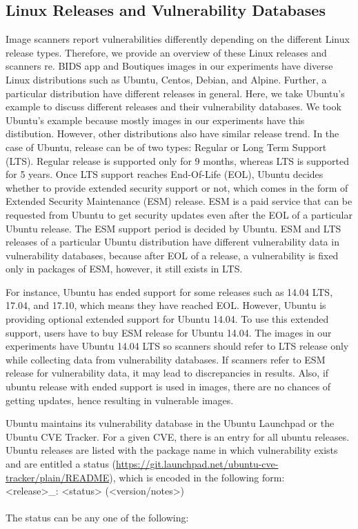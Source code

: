 \documentclass[a4paper,num-refs]{oup-contemporary}
\begin{document}
\subsection{Linux Releases and Vulnerability Databases}

Image scanners report vulnerabilities differently depending on the different Linux release types.
Therefore, we provide an overview of these Linux releases and scanners re. 
BIDS app and Boutiques images in our experiments have diverse Linux
distributions such as Ubuntu, Centos, Debian, and Alpine. Further, a particular
distribution have different releases in general. Here, we take Ubuntu's example
to discuss different releases and their vulnerability databases. We took Ubuntu's example
because mostly images in our experiments have this distibution. However, other distributions also have
similar release trend. In the case of Ubuntu, release
can be of two types: Regular or Long Term Support (LTS).
Regular release is supported only for 9 months, whereas LTS is supported for 5 years. Once LTS support
reaches End-Of-Life (EOL), Ubuntu decides whether to provide extended security support or not, which comes
in the form of Extended Security Maintenance (ESM) release.
ESM is a paid service that can be requested from Ubuntu to get security 
updates even after the EOL of a particular Ubuntu release. The ESM support period is decided by
Ubuntu. ESM and LTS releases of a particular Ubuntu distribution have different vulnerability
data in vulnerability databases, because after EOL of a release, a vulnerability is fixed only in packages of ESM, however, it still
exists in LTS.

For instance, Ubuntu has ended support for some releases such as 14.04 LTS,
17.04, and 17.10, which means they have reached EOL. However, Ubuntu is providing optional extended support for Ubuntu 14.04.
To use this extended support, users have to buy ESM release for Ubuntu 14.04.
The images in our experiments have Ubuntu 14.04 LTS so scanners should refer
to LTS release only while collecting data from vulnerability databases. If scanners refer to ESM release for 
vulnerability data, it may lead to discrepancies in results.
Also, if ubuntu release with ended support is used in images, there are no chances of getting updates, hence
resulting in vulnerable images. 

Ubuntu maintains its vulnerability database in the Ubuntu Launchpad or the Ubuntu CVE Tracker. For a given CVE, there is an entry for all ubuntu releases.
Ubuntu releases are listed with the package name
in which vulnerability exists and are entitled a status
(\href{https://git.launchpad.net/ubuntu-cve-tracker/plain/README}{https://git.launchpad.net/ubuntu-cve-tracker/plain/README}), which is
encoded in the following form:
\newline \\
\noindent <release>\_<source-package>: <status> (<version/notes>) \\
\newline\\
The status can be any one of the following:
\end{document}

